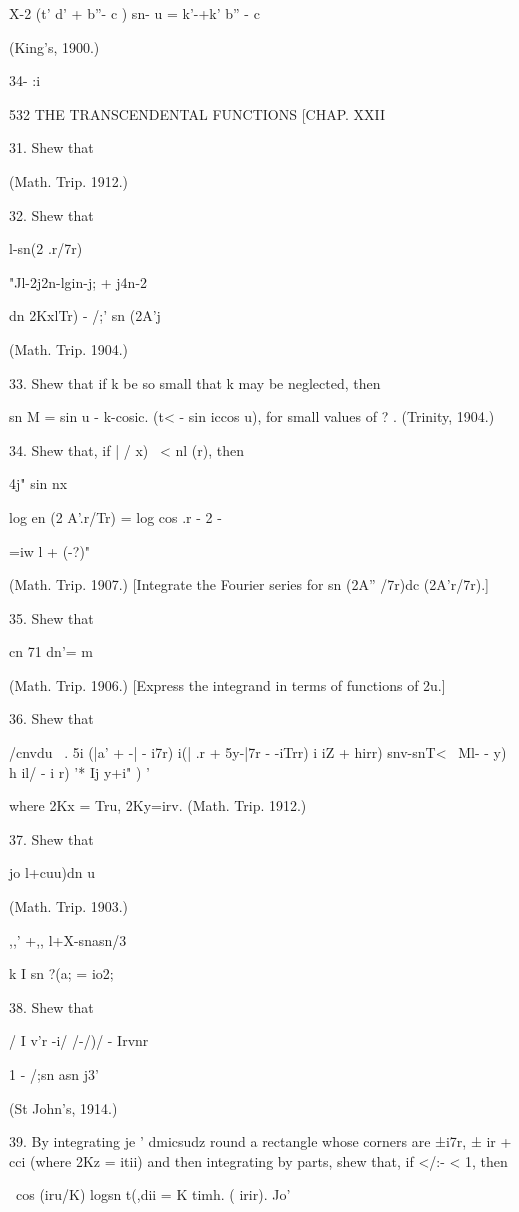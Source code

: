 X-2 (t' d' + b''- c ) sn- u = k'-+k' b'' - c\

(King's, 1900.)

34- :i

532 THE TRANSCENDENTAL FUNCTIONS [CHAP. XXII

31. Shew that

(Math. Trip. 1912.)

32. Shew that

l-sn(2 .r/7r)

"Jl-2j2n-lgin-j; + j4n-2

 dn 2KxlTr) - /;' sn (2A'j

(Math. Trip. 1904.)

33. Shew that if k be so small that k may be neglected, then

sn M = sin u - k-cosic. (t< - sin iccos u), for small values of ? .
(Trinity, 1904.)

34. Shew that, if | / x) \ < nl (r), then

4j" sin nx

log en (2 A'.r/Tr) = log cos .r - 2 -

 =iw l + (-?)"

(Math. Trip. 1907.) [Integrate the Fourier series for sn (2A'' /7r)dc
(2A'r/7r).]

35. Shew that

cn 71 dn'= m

(Math. Trip. 1906.) [Express the integrand in terms of functions of
2u.]

36. Shew that

/cnvdu \ . 5i (|a' + -| - i7r) i(| .r + 5y-|7r - -iTrr) i iZ + hirr)
snv-snT<~ Ml- - y) h il/ - i r) '* Ij y+i" ) '

where 2Kx = Tru, 2Ky=irv. (Math. Trip. 1912.)

37. Shew that

  jo l+cuu)dn u

(Math. Trip. 1903.)

,,' +,, l+X-snasn/3

k I sn ?(a; = io2;

38. Shew that

/ I v'r -i/ /-/)/ - Irvnr

1 - /;sn asn j3'

(St John's, 1914.)

39. By integrating je ' dmicsudz round a rectangle whose corners are
±i7r, ± ir + cci (where 2Kz = itii) and then integrating by parts,
shew that, if </:- < 1, then

\ cos (iru/K) logsn t(,dii = K timh. ( irir). Jo'

